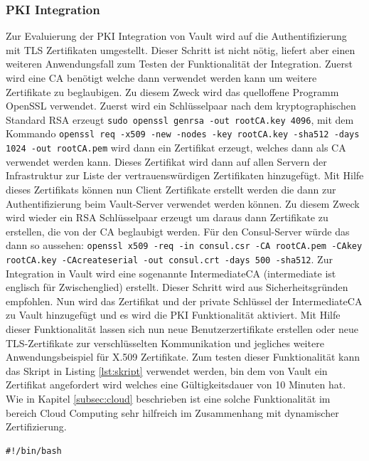 \documentclass[
book,
a4paper,   
titlepage,  
halfparskip,
12pt        
]{scrartcl}
\newcommand\inline{\lstinline[basicstyle=\ttfamily]}
\begin{document}
\begin{onehalfspacing}
\subsubsection{\acs{PKI} Integration} 
Zur Evaluierung der \ac{PKI} Integration von Vault wird auf die Authentifizierung mit \ac{TLS} Zertifikaten umgestellt. Dieser Schritt ist nicht nötig, liefert aber einen weiteren Anwendungsfall zum Testen der Funktionalität der Integration. Zuerst wird eine \ac{CA} benötigt welche dann verwendet werden kann um weitere Zertifikate zu beglaubigen. Zu diesem Zweck wird das quelloffene Programm OpenSSL verwendet. Zuerst wird ein Schlüsselpaar nach dem kryptographischen Standard RSA erzeugt \inline|sudo openssl genrsa -out rootCA.key 4096|, mit dem Kommando \inline|openssl req -x509 -new -nodes -key rootCA.key -sha512 -days 1024 -out rootCA.pem| wird dann ein Zertifikat erzeugt, welches dann als \ac{CA} verwendet werden kann. Dieses Zertifikat wird dann auf allen Servern der Infrastruktur zur Liste der vertrauenswürdigen Zertifikaten hinzugefügt. Mit Hilfe dieses Zertifikats können nun Client Zertifikate erstellt werden die dann zur Authentifizierung beim Vault-Server verwendet werden können. Zu diesem Zweck wird wieder ein RSA Schlüsselpaar erzeugt um daraus dann Zertifikate zu erstellen, die von der \ac{CA} beglaubigt werden. Für den Consul-Server würde das dann so aussehen: \inline|openssl x509 -req -in consul.csr -CA rootCA.pem -CAkey rootCA.key -CAcreateserial -out consul.crt -days 500 -sha512|.\cite{openssl}\newline
Zur Integration in Vault wird eine sogenannte Intermediate\ac{CA} (intermediate ist englisch für Zwischenglied) erstellt. Dieser Schritt wird aus Sicherheitsgründen empfohlen. Nun wird das Zertifikat und der private Schlüssel der Intermediate\ac{CA} zu Vault hinzugefügt und es wird die \ac{PKI} Funktionalität aktiviert. Mit Hilfe dieser Funktionalität lassen sich nun neue Benutzerzertifikate erstellen oder neue \ac{TLS}-Zertifikate zur verschlüsselten Kommunikation und jegliches weitere Anwendungsbeispiel für X.509 Zertifikate. Zum testen dieser Funktionalität kann das Skript in Listing \vref{lst:skript} verwendet werden, bin dem von Vault ein Zertifikat angefordert wird welches eine Gültigkeitsdauer von 10 Minuten hat. Wie in Kapitel \vref{subsec:cloud} beschrieben ist eine solche Funktionalität im bereich Cloud Computing sehr hilfreich im Zusammenhang mit dynamischer Zertifizierung.  


\begin{lstlisting}[caption={[Skript PKI] Shell Skript zum Erstellen eines neuen Benutzerzertifikats unter Verwendung der Vault \ac{PKI}}, label=lst:skript, captionpos=b, basicstyle=\ttfamily] 
#!/bin/bash


\end{lstlisting}
\end{onehalfspacing}
\end{document}
